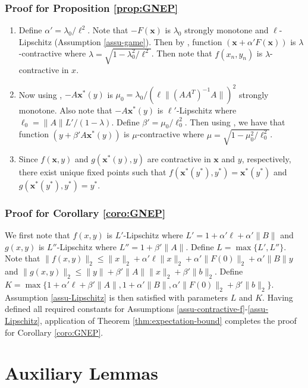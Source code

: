 \documentclass[letterpaper, 10 pt, conference]{ieeeconf}  %
\theoremstyle{definition}
\theoremstyle{plain}
\newcommand{\ystar}{y^*}
\newcommand{\xx}{\mathbf{x}}
\begin{document}
\subsubsection{\textbf{Proof for Proposition \ref{prop:GNEP}}}
\begin{enumerate}[label=\alph*)]
    \item Define $\alpha'=\lambda_0/\ell^2$. Note that $-F(\xx)$ is $\lambda_0$ strongly monotone and $\ell$-Lipschitz (Assumption \ref{assu-game}). Then by \cite[Lemma D.1]{Chandak-nonexp}, function $(\xx+\alpha'F(\xx))$ is $\lambda$-contractive where $\lambda=\sqrt{1-\lambda_0^2/\ell^2}$. Then note that $f(x_n,y_n)$ is $\lambda$-contractive in $x$.
    \item Now using \cite[Lemma 5.6 a)]{Chandak-nonexp}, $-A\xx^*(y)$ is $\mu_0=\lambda_0/(\ell\|(AA^T)^{-1}A\|)^2$ strongly monotone. Also note that $-A\xx^*(y)$ is $\ell'$-Lipschitz where $\ell_0=\|A\|L'/(1-\lambda)$. Define $\beta'=\mu_0/\ell_0^2$. Then using \cite[Lemma D.1]{Chandak-nonexp}, we have that function $(y+\beta'A\xx^*(y))$ is $\mu$-contractive where $\mu=\sqrt{1-\mu_0^2/\ell_0^2}$.
    \item Since $f(\xx,y)$ and $g(\xx^*(y),y)$ are contractive in $\xx$ and $y$, respectively, there exist unique fixed points such that $f(\xx^*(\ystar),\ystar)=\xx^*(\ystar)$ and $g(\xx^*(\ystar),\ystar)=\ystar$.
\end{enumerate}

\subsubsection{\textbf{Proof for Corollary \ref{coro:GNEP}}}
We first note that $f(x,y)$ is $L'$-Lipschitz where $L'=1+\alpha'\ell+\alpha'\|B\|$ and $g(x,y)$ is $L''$-Lipschitz where $L''=1+\beta'\|A\|$. Define $L=\max\{L',L''\}$. Note that $\|f(x,y)\|_2\leq \|x\|_2+\alpha'\ell\|x\|_2+\alpha'\|F(0)\|_2+\alpha'\|B\|y$ and $\|g(x,y)\|_2\leq \|y\|+\beta'\|A\|\|x\|_2+\beta'\|b\|_2$. Define $K=\max\{1+\alpha'\ell+\beta'\|A\|,1+\alpha'\|B\|,\alpha'\|F(0)\|_2+\beta'\|b\|_2\}$. Assumption \ref{assu-Lipschitz} is then satisfied with parameters $L$ and $K$. Having defined all required constants for Assumptions \ref{assu-contractive-f}-\ref{assu-Lipschitz}, application of Theorem \ref{thm:expectation-bound} completes the proof for Corollary \ref{coro:GNEP}.


\section{Auxiliary Lemmas}
\end{document}
